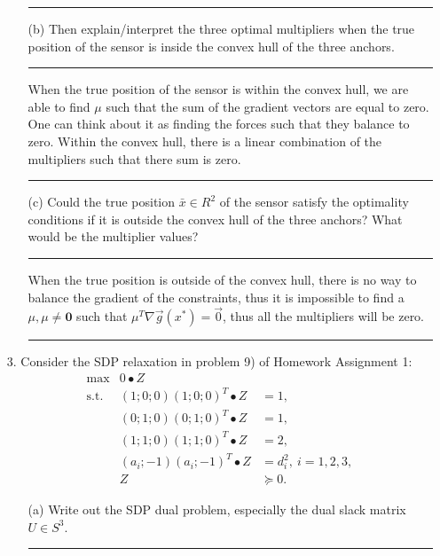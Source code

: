 \documentclass{article} %
\newcommand{\B}[1]{\mathbf#1}
\begin{document}
\begin{enumerate}
\begin{itemize}
\rule{\textwidth}{1pt}

\item[(b)] Then explain/interpret the three optimal multipliers when the true position of the sensor is inside the convex hull of the three anchors.


\rule{\textwidth}{1pt}

When the true position of the sensor is within the convex hull, we are able to find $\mu$ such that the sum of the gradient vectors are equal to zero. One can think about it as finding the forces such that they balance to zero. Within the convex hull, there is a linear combination of the multipliers such that there sum is zero. 

\rule{\textwidth}{1pt}


\item[(c)] Could the true position $\bar{x}\in R^2$ of the sensor satisfy the optimality conditions if it is outside the convex hull of the three anchors? What would be the multiplier values?


\rule{\textwidth}{1pt}

When the true position is outside  of the convex hull, there is no way to balance the gradient of the constraints, thus it is impossible to find a $ \mu, \mu \neq \B{0}$ such that $\mu^T  \nabla \vec{g}(x^{*}) = \vec{0}$, thus all the multipliers will be zero. 


\rule{\textwidth}{1pt}


\end{itemize}

\item[3.] Consider the SDP relaxation in problem 9) of Homework Assignment 1:
\[\begin{array}{rcl}
\max          & 0\bullet Z &\\
\mbox{s.t.} &(1;0;0)(1;0;0)^T\bullet Z &=1,\\
                 &(0;1;0)(0;1;0)^T\bullet Z& =1,\\
                 &(1;1;0)(1;1;0)^T\bullet Z& =2,\\
                 &(a_i;-1)(a_i;-1)^T\bullet Z &= d^2_i,\ i=1,2,3,\\
                 &                                Z &\succeq 0.
\end{array}
\]
\begin{itemize}
\item[(a)] Write out the SDP dual problem, especially the dual slack matrix $U\in S^{3}$.

\rule{\textwidth}{1pt}


\end{itemize}
\end{enumerate}
\end{document}
